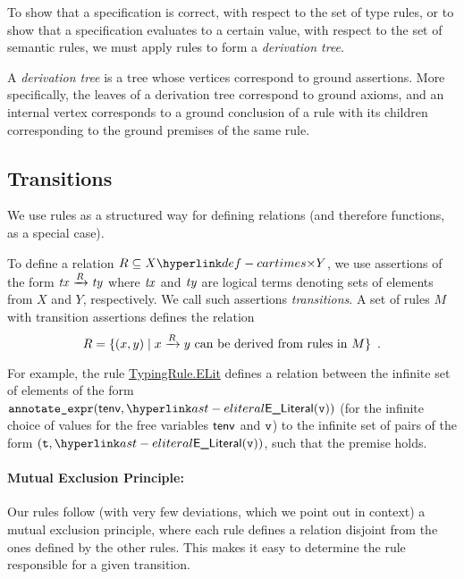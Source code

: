 To show that a specification is correct, with respect to the set of type rules,
or to show that a specification evaluates to a certain value, with respect to
the set of semantic rules, we must apply rules to form a \emph{derivation tree}.

\hypertarget{def-derivationtree}{}
\begin{definition}
  A \emph{derivation tree} is a tree whose vertices correspond to ground assertions.
  More specifically, the leaves of a derivation tree correspond to ground axioms,
  and an internal vertex corresponds to a ground conclusion of a rule with its children
  corresponding to the ground premises of the same rule.
\end{definition}


\subsection{Transitions\label{sec:transitions}}

We use rules as a structured way for defining relations (and therefore functions, as a special case).

To define a relation $R \subseteq X \cartimes Y$, we use assertions of the form $\mathit{tx} \xrightarrow{R} \mathit{ty}$
where $\mathit{tx}$ and $\mathit{ty}$ are logical terms denoting sets of elements from $X$ and $Y$, respectively.
%
We call such assertions \emph{transitions}.
A set of rules $M$ with transition assertions defines the relation
\[
    R = \{ (x,y) \;|\; x \xrightarrow{R} y \text{ can be derived from rules in } M\} \enspace.
\]

For example, the rule \hyperlink{TypingRule.ELit}{TypingRule.ELit} defines a relation
between the infinite set of elements of the form
$\texttt{annotate\_expr}(\tenv, \ELiteral(\vv))$ (for the
infinite choice of values for the free variables $\textsf{tenv}$ and
$\texttt{v}$) to the infinite set of pairs of the form $(\vt,
\ELiteral(\vv))$, such that the premise holds.

\paragraph{Mutual Exclusion Principle:}
Our rules follow (with very few deviations, which we point out
in context) a mutual exclusion principle, where each rule
defines a relation disjoint from the ones defined by the other
rules.  This makes it easy to determine the rule responsible
for a given transition.

